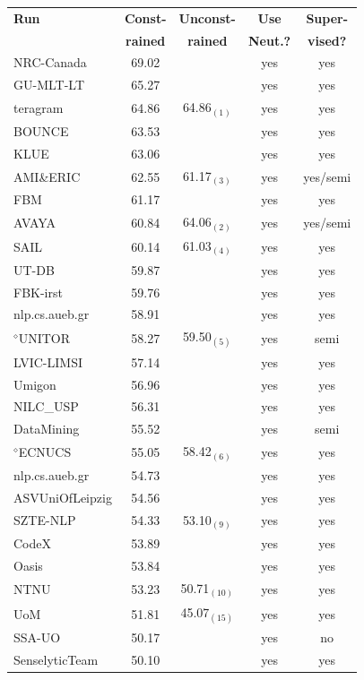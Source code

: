 \begin{table}[t!]
    \centering
    \begin{small}
    \begin{tabular}{l@{ }c@{ }c@{ }c@{ }c}
    \bf Run & \bf Const- & \bf Unconst- & \bf Use & \bf Super-\\
    & \bf rained & \bf rained & \bf Neut.? & \bf vised?\\
    \hline
    NRC-Canada & 69.02 &  & yes & yes\\
    GU-MLT-LT & 65.27 &  & yes & yes\\
    teragram & 64.86 & 64.86$_{(1)}$ & yes & yes\\
    BOUNCE & 63.53 &  & yes & yes\\
    KLUE & 63.06 &  & yes & yes\\
    AMI\&ERIC & 62.55 & 61.17$_{(3)}$ & yes & yes/semi\\
    FBM & 61.17 &  & yes & yes\\
    AVAYA & 60.84 & 64.06$_{(2)}$ & yes & yes/semi\\
    SAIL & 60.14 & 61.03$_{(4)}$ & yes & yes\\
    UT-DB & 59.87 &  & yes & yes\\
    FBK-irst & 59.76 &  & yes & yes\\
    nlp.cs.aueb.gr & 58.91 &  & yes & yes\\
    $^\diamond$UNITOR & 58.27 & 59.50$_{(5)}$ & yes & semi\\
    LVIC-LIMSI & 57.14 &  & yes & yes\\
    Umigon & 56.96 &  & yes & yes\\
    NILC\_USP & 56.31 &  & yes & yes\\
    DataMining & 55.52 &  & yes & semi\\
    $^\diamond$ECNUCS & 55.05 & 58.42$_{(6)}$ & yes & yes\\
    nlp.cs.aueb.gr & 54.73 &  & yes & yes\\
    ASVUniOfLeipzig & 54.56 &  & yes & yes\\
    SZTE-NLP & 54.33 & 53.10$_{(9)}$ & yes & yes\\
    CodeX & 53.89 &  & yes & yes\\
    Oasis & 53.84 &  & yes & yes\\
    NTNU & 53.23 & 50.71$_{(10)}$ & yes & yes\\
    UoM & 51.81 & 45.07$_{(15)}$ & yes & yes\\
    SSA-UO & 50.17 &  & yes & no\\
    SenselyticTeam & 50.10 &  & yes & yes\\

\end{tabular}
\end{small}
\end{table}

